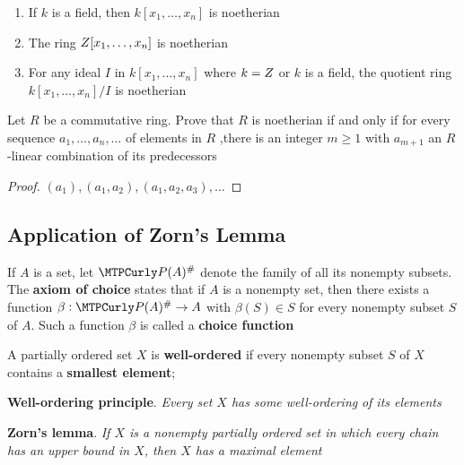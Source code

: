 \documentclass[11pt]{article}
\begin{document}
\begin{corollary}[]
\begin{enumerate}
\item If \(k\) is a field, then \(k[x_1,\dots,x_n]\) is noetherian
\item The ring \(\relax{Z}[x_1,\dots,x_n]\) is noetherian
\item For any ideal \(I\) in \(k[x_1,\dots,x_n]\) where \(k=\relax{Z}\) or \(k\) is a
field, the quotient ring \(k[x_1,\dots,x_n]/I\) is noetherian
\end{enumerate}
\end{corollary}

\begin{exercise}
\label{ex6.32}
Let \(R\) be a commutative ring. Prove that \(R\) is noetherian if and only if
for every sequence \(a_1,\dots,a_n,\dots\) of elements in \(R\) ,there is an
integer \(m\ge1\) with \(a_{m+1}\) an \(R\)-linear combination of its predecessors
\end{exercise}

\begin{proof}
\((a_1),(a_1,a_2),(a_1,a_2,a_3),\dots\)
\end{proof}
\subsection{Application of Zorn's Lemma}
\label{sec:orgbd71ce7}
\begin{definition}[]
If \(A\) is a set, let \(\calp(A)^\#\) denote the family of all its nonempty
subsets. The \textbf{axiom of choice} states that if \(A\) is a nonempty set, then there
exists a function \(\beta:\calp(A)^\#\to A\) with \(\beta(S)\in S\) for every nonempty
subset \(S\) of \(A\). Such a function \(\beta\) is called a \textbf{choice function}
\end{definition}

\begin{definition}[]
A partially ordered set \(X\) is \textbf{well-ordered} if every nonempty subset \(S\) of
\(X\) contains a \textbf{smallest element};
\end{definition}

\textbf{Well-ordering principle}. \hspace{0.1cm} \emph{Every set \(X\) has some well-ordering}
\emph{of its elements}


\textbf{Zorn's lemma}. \hspace{0.1cm} \emph{If \(X\) is a nonempty partially ordered set in}
\emph{which every chain has an upper bound in \(X\), then \(X\) has a maximal element}
\end{document}
